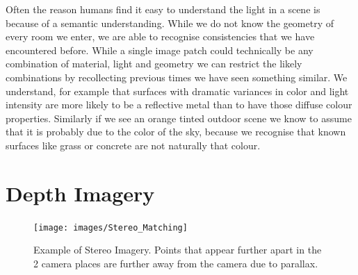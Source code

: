\documentclass[ %
                    author={Gavin Parker},
                supervisor={Dr. Neill Campbell},
                    degree={MEng},
                     title={Deep Siamese Networks for Illumination Estimation from Stereo Images},
                  subtitle={},
                      type={research},
                      year={2018} ]{dissertation}
\begin{document}
\newline
Often the reason humans find it easy to understand the light in a scene is because of a semantic understanding. While we do not know the geometry of every room we enter, we are able to recognise consistencies that we have encountered before. While a single image patch could technically be any combination of material, light and geometry we can restrict the likely combinations by recollecting previous times we have seen something similar. We understand, for example that surfaces with dramatic variances in color and light intensity are more likely to be a reflective metal than to have those diffuse colour properties. Similarly if we see an orange tinted outdoor scene we know to assume that it is probably due to the color of the sky, because we recognise that known surfaces like grass or concrete are not naturally that colour.
\section{Depth Imagery}
\begin{figure}[H]
\centering
\texttt{[image: images/Stereo\_Matching]}
\caption{Example of Stereo Imagery. Points that appear further apart in the 2 camera places are further away from the camera due to parallax.}
\end{figure}
\end{document}
